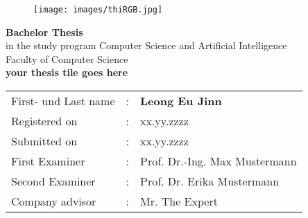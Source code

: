 

\begin{titlepage}	
		\begin{figure}[!h]
			\centering
			\texttt{[image: images/thiRGB.jpg]}	
		\end{figure}																			
	
	\begin{center}
		\hrulefill 
	\end{center}
	
	
	\begin{center}	
		\vspace{1cm}
		
		\huge\textbf{
			Bachelor Thesis}\\[2.5em]
		\normalsize
			in the study program Computer Science and Artificial Intelligence\\ Faculty of Computer Science	\\ [7em]
	
		\Large\textbf{your thesis tile goes here}	 \\ 

	\end{center}

	\vfill
	
	
	\begin{tabular}{lll}
		First- und Last name &: & \textbf{Leong Eu Jinn}	\\ [3em]
		
		Registered on &:	& xx.yy.zzzz	\\ [1em] %
		Submitted on &:	& xx.yy.zzzz	\\ [3em] %
		
		First Examiner &: 	& Prof. Dr.-Ing. Max Mustermann	\\ [1em]
		Second Examiner &: 	& Prof. Dr. Erika Mustermann	\\[3em]
		
		Company advisor &:	& Mr. The Expert \\ %
	\end{tabular}
	
\end{titlepage}

\restoregeometry